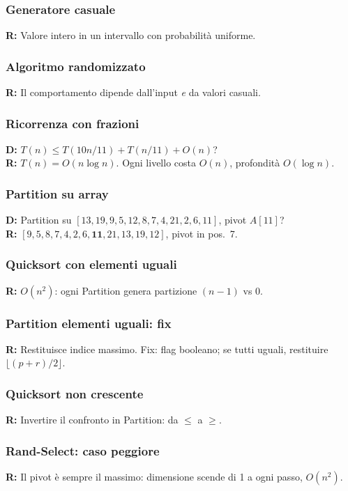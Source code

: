 \subsubsection*{Generatore casuale}
\textbf{R:} Valore intero in un intervallo con probabilità uniforme.

\subsubsection*{Algoritmo randomizzato}
\textbf{R:} Il comportamento dipende dall'input \emph{e} da valori casuali.

\subsubsection*{Ricorrenza con frazioni}
\textbf{D:} $T(n)\le T(10n/11)+T(n/11)+O(n)$?\\
\textbf{R:} $T(n) = O(n\log n)$. Ogni livello costa $O(n)$, profondità
$O(\log n)$.

\subsubsection*{Partition su array}
\textbf{D:} Partition su $[13,19,9,5,12,8,7,4,21,2,6,11]$, pivot $A[11]$?\\
\textbf{R:} $[9,5,8,7,4,2,6,\mathbf{11},21,13,19,12]$, pivot in pos.\ 7.

\subsubsection*{Quicksort con elementi uguali}
\textbf{R:} $O(n^2)$: ogni Partition genera partizione $(n{-}1)$ vs $0$.

\subsubsection*{Partition elementi uguali: fix}
\textbf{R:} Restituisce indice massimo. Fix: flag booleano; se tutti uguali,
restituire $\lfloor(p+r)/2\rfloor$.

\subsubsection*{Quicksort non crescente}
\textbf{R:} Invertire il confronto in Partition: da $\le$ a $\ge$.

\subsubsection*{Rand-Select: caso peggiore}
\textbf{R:} Il pivot è sempre il massimo: dimensione scende di 1 a ogni
passo, $O(n^2)$.


